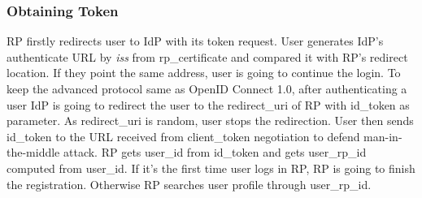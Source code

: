\subsubsection{Obtaining Token}
RP firstly redirects user to IdP with its token request. User generates IdP's authenticate URL by \emph{iss} from rp\_certificate and compared it with RP's redirect location. If they point the same address, user is going to continue the login.
To keep the advanced protocol same as OpenID Connect 1.0, after authenticating a user IdP is going to redirect the user to the redirect\_uri of RP with id\_token as parameter. As redirect\_uri is random, user stops the redirection. User then sends id\_token to the URL received from client\_token negotiation to defend man-in-the-middle attack. RP gets user\_id from id\_token and gets user\_rp\_id computed from user\_id. If it's the first time user logs in RP, RP is going to finish the registration. Otherwise RP searches user profile through user\_rp\_id. 
